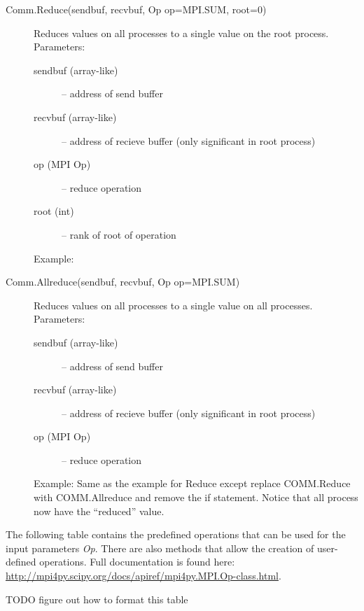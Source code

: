 \begin{description}
\item[Comm.Reduce(sendbuf, recvbuf, Op op=MPI.SUM, root=0)]
Reduces values on all processes to a single value on the root process.
Parameters:
\begin{description}
\item[sendbuf (array-like)] – address of send buffer
\item[recvbuf (array-like)] – address of recieve buffer (only significant in root process)
\item[op (MPI Op)] – reduce operation
\item[root (int)] – rank of root of operation
\end{description}
Example:

\item[Comm.Allreduce(sendbuf, recvbuf, Op op=MPI.SUM)]
Reduces values on all processes to a single value on all processes.
Parameters:
\begin{description}
\item[sendbuf (array-like)] – address of send buffer
\item[recvbuf (array-like)] – address of recieve buffer (only significant in root process)
\item[op (MPI Op)] – reduce operation
\end{description}
Example:
Same as the example for Reduce except replace COMM.Reduce with COMM.Allreduce and remove the if statement. Notice that all process now have the “reduced” value.
\end{description}

The following table contains the predefined operations that can be used for the input parameters \emph{Op}. There are also methods that allow the creation of user-defined operations. Full documentation is found here: \url{http://mpi4py.scipy.org/docs/apiref/mpi4py.MPI.Op-class.html}.

TODO figure out how to format this table






